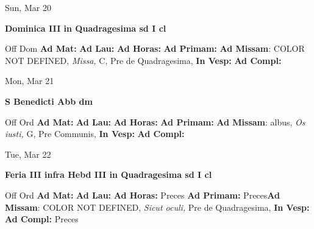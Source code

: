 \documentclass[10pt]{book}
\begin{document}
\begin{center}
\begin{minipage}{3.5in}
\vspace{2em}
\begin{center}Sun, Mar 20
\end{center}
\textbf{ \large Dominica III in Quadragesima
\textnormal{\normalsize sd I cl}}

\begin{justify}Off Dom
\textbf{Ad Mat: }
\textbf{Ad Lau: }
\textbf{Ad Horas: }
\textbf{Ad Primam: }\textbf{Ad Missam}: COLOR NOT DEFINED, \textit{Missa,} C, Pre de Quadragesima, 
\textbf{In Vesp: }
\textbf{Ad Compl: }
\end{justify}
\end{minipage}
\end{center}

\begin{center}
\begin{minipage}{3.5in}
\vspace{2em}
\begin{center}Mon, Mar 21
\end{center}
\textbf{ \large S Benedicti Abb
\textnormal{\normalsize dm}}

\begin{justify}Off Ord
\textbf{Ad Mat: }
\textbf{Ad Lau: }
\textbf{Ad Horas: }
\textbf{Ad Primam: }\textbf{Ad Missam}: albus, \textit{Os iusti,} G, Pre Communis, 
\textbf{In Vesp: }
\textbf{Ad Compl: }
\end{justify}
\end{minipage}
\end{center}

\begin{center}
\begin{minipage}{3.5in}
\vspace{2em}
\begin{center}Tue, Mar 22
\end{center}
\textbf{ \large Feria III infra Hebd III in Quadragesima
\textnormal{\normalsize sd I cl}}

\begin{justify}Off Ord
\textbf{Ad Mat: }
\textbf{Ad Lau: }
\textbf{Ad Horas: }Preces
\textbf{Ad Primam: }Preces\textbf{Ad Missam}: COLOR NOT DEFINED, \textit{Sicut oculi,} Pre de Quadragesima, 
\textbf{In Vesp: }
\textbf{Ad Compl: }Preces
\end{justify}
\end{minipage}
\end{center}
\end{document}
